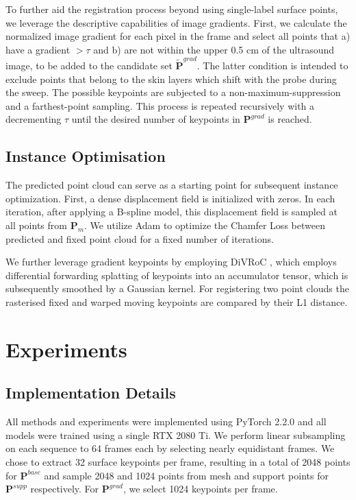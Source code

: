 To further aid the registration process beyond using single-label surface points, we leverage the descriptive capabilities of image gradients. First, we calculate the normalized image gradient for each pixel in the frame and select all points that a) have a gradient $> \tau$ and b) are not within the upper 0.5 cm of the ultrasound image, to be added to the candidate set $\tilde{\mathbf{P}}^{grad}$. The latter condition is intended to exclude points that belong to the skin layers which shift with the probe during the sweep. The possible keypoints are subjected to a non-maximum-suppression and a farthest-point sampling. This process is repeated recursively with a decrementing $\tau$ until the desired number of keypoints in $\mathbf{P}^{grad}$ is reached.

\subsection{Instance Optimisation}
The predicted point cloud can serve as a starting point for subsequent instance optimization. First, a dense displacement field is initialized with zeros. In each iteration, after applying a B-spline model, this displacement field is sampled at all points from $\mathbf{P}_m$. We utilize Adam\citep{kingma2014adam} to optimize the Chamfer Loss between predicted and fixed point cloud for a fixed number of iterations. 

We further leverage gradient keypoints by employing DiVRoC \citep{heinrich2023chasing}, which employs differential forwarding splatting of keypoints into an accumulator tensor, which is subsequently smoothed by a Gaussian kernel. For registering two point clouds the rasterised fixed and warped moving keypoints are compared by their L1 distance.


\section{Experiments}

\subsection{Implementation Details}
All methods and experiments were implemented using PyTorch 2.2.0 and all models were trained using a single RTX 2080 Ti. We perform linear subsampling on each sequence to 64 frames each by selecting nearly equidistant frames. We chose to extract 32 surface keypoints per frame, resulting in a total of 2048 points for $\mathbf{P}^{base}$ and sample 2048 and 1024 points from mesh and support points for $\mathbf{P}^{supp}$ respectively. For $\mathbf{P}^{grad}$, we select 1024 keypoints per frame. 

